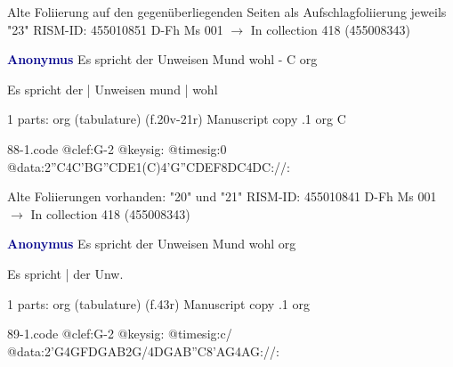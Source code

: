 \documentclass[twocolumn]{book}
\begin{document}
\newline Alte Foliierung auf den gegenüberliegenden Seiten als Aufschlagfoliierung jeweils "23"
\newline RISM-ID: 455010851
\newline D-Fh  Ms 001
\newline $\rightarrow$ In collection 418 (455008343)
      
\newline \par \vspace{7pt} \textcolor{darkblue}{\textbf{Anonymus  }}
\newline Es spricht der Unweisen Mund wohl - C
\newline org
\newline \begin{itshape}[f.20v, at left:] Es spricht der | Unweisen mund | wohl\end{itshape} 
\newline \textcolor{darkblue}{}  1 parts: org (tabulature)  (f.20v-21r)
\newline Manuscript copy
.1  org  C  
\begin{filecontents*}{88-1.code}
@clef:G-2
@keysig:
@timesig:0
@data:2''C4C'BG''CDE1(C)4'G''CDEF{8DC}4DC://:
\end{filecontents*}
\newline
%

\newline Alte Foliierungen vorhanden: "20" und "21"
\newline RISM-ID: 455010841
\newline D-Fh  Ms 001
\newline $\rightarrow$ In collection 418 (455008343)
      
\newline \par \vspace{7pt} \textcolor{darkblue}{\textbf{Anonymus  }}
\newline Es spricht der Unweisen Mund wohl
\newline org
\newline \begin{itshape}[f.43r, at left:] Es spricht | der Unw.\end{itshape} 
\newline \textcolor{darkblue}{}  1 parts: org (tabulature)  (f.43r)
\newline Manuscript copy
.1  org  
\begin{filecontents*}{89-1.code}
@clef:G-2
@keysig:
@timesig:c/
@data:2'G4GFDGAB2G/4DGAB''C{8'AG}4AG://:
\end{filecontents*}
\newline
%
\end{document}
